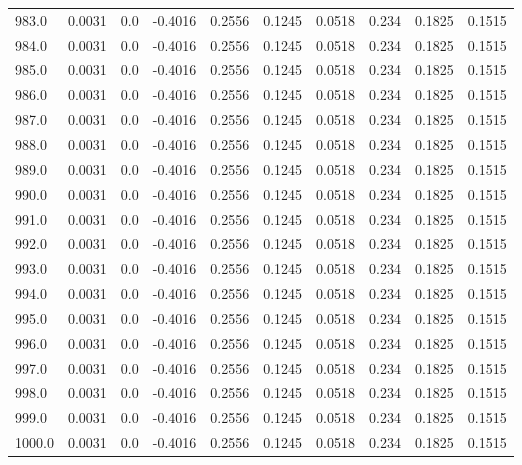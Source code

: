 \begin{longtable}{lrrrrrrrrr}
983.0 & 0.0031 & 0.0 & -0.4016 & 0.2556 & 0.1245 & 0.0518 & 0.234 & 0.1825 & 0.1515 \\
984.0 & 0.0031 & 0.0 & -0.4016 & 0.2556 & 0.1245 & 0.0518 & 0.234 & 0.1825 & 0.1515 \\
985.0 & 0.0031 & 0.0 & -0.4016 & 0.2556 & 0.1245 & 0.0518 & 0.234 & 0.1825 & 0.1515 \\
986.0 & 0.0031 & 0.0 & -0.4016 & 0.2556 & 0.1245 & 0.0518 & 0.234 & 0.1825 & 0.1515 \\
987.0 & 0.0031 & 0.0 & -0.4016 & 0.2556 & 0.1245 & 0.0518 & 0.234 & 0.1825 & 0.1515 \\
988.0 & 0.0031 & 0.0 & -0.4016 & 0.2556 & 0.1245 & 0.0518 & 0.234 & 0.1825 & 0.1515 \\
989.0 & 0.0031 & 0.0 & -0.4016 & 0.2556 & 0.1245 & 0.0518 & 0.234 & 0.1825 & 0.1515 \\
990.0 & 0.0031 & 0.0 & -0.4016 & 0.2556 & 0.1245 & 0.0518 & 0.234 & 0.1825 & 0.1515 \\
991.0 & 0.0031 & 0.0 & -0.4016 & 0.2556 & 0.1245 & 0.0518 & 0.234 & 0.1825 & 0.1515 \\
992.0 & 0.0031 & 0.0 & -0.4016 & 0.2556 & 0.1245 & 0.0518 & 0.234 & 0.1825 & 0.1515 \\
993.0 & 0.0031 & 0.0 & -0.4016 & 0.2556 & 0.1245 & 0.0518 & 0.234 & 0.1825 & 0.1515 \\
994.0 & 0.0031 & 0.0 & -0.4016 & 0.2556 & 0.1245 & 0.0518 & 0.234 & 0.1825 & 0.1515 \\
995.0 & 0.0031 & 0.0 & -0.4016 & 0.2556 & 0.1245 & 0.0518 & 0.234 & 0.1825 & 0.1515 \\
996.0 & 0.0031 & 0.0 & -0.4016 & 0.2556 & 0.1245 & 0.0518 & 0.234 & 0.1825 & 0.1515 \\
997.0 & 0.0031 & 0.0 & -0.4016 & 0.2556 & 0.1245 & 0.0518 & 0.234 & 0.1825 & 0.1515 \\
998.0 & 0.0031 & 0.0 & -0.4016 & 0.2556 & 0.1245 & 0.0518 & 0.234 & 0.1825 & 0.1515 \\
999.0 & 0.0031 & 0.0 & -0.4016 & 0.2556 & 0.1245 & 0.0518 & 0.234 & 0.1825 & 0.1515 \\
1000.0 & 0.0031 & 0.0 & -0.4016 & 0.2556 & 0.1245 & 0.0518 & 0.234 & 0.1825 & 0.1515 \\
\end{longtable}